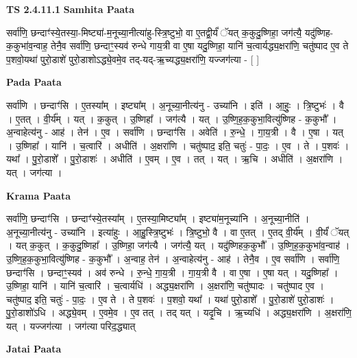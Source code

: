 \documentclass[17pt]{extarticle}
\begin{document}
\textbf{TS 2.4.11.1 } \newline
\textbf{Samhita Paata} \newline

सर्वा॑णि॒ छन्दाꣳ॑स्ये॒तस्या॒-मिष्ट्या॑-म॒नूच्या॒नीत्या॑हु-स्त्रि॒ष्टुभो॒ वा ए॒तद्वी॒र्यं॑ ॅयत् क॒कुदु॒ष्णिहा॒ जग॑त्यै॒ यदु॑ष्णिह-क॒कुभा॑व॒न्वाह॒ तेनै॒व सर्वा॑णि॒ छन्दाꣳ॒॒स्यव॑ रुन्धे गाय॒त्री वा ए॒षा यदु॒ष्णिहा॒ यानि॑ च॒त्वार्यद्ध्य॒क्षरा॑णि॒ चतु॑ष्पाद ए॒व ते प॒शवो॒यथा॑ पुरो॒डाशे॑ पुरो॒डाशोऽद्ध्ये॒वमे॒व तद्-यद्-ऋ॒च्यद्ध्य॒क्षरा॑णि॒ यज्जग॑त्या - [  ] \newline

\textbf{Pada Paata} \newline

सर्वा॑णि । छन्दाꣳ॑सि । ए॒तस्या᳚म् । इष्ट्या᳚म् । अ॒नूच्या॒नीत्य॑नु - उच्या॑नि । इति॑ । आ॒हुः॒ । त्रि॒ष्टुभः॑ । वै । ए॒तत् । वी॒र्य᳚म् । यत् । क॒कुत् । उ॒ष्णिहा᳚ । जग॑त्यै । यत् । उ॒ष्णि॒ह॒क॒कुभा॒वित्यु॑ष्णिह - क॒कुभौ᳚ । अ॒न्वाहेत्य॑नु - आह॑ । तेन॑ । ए॒व । सर्वा॑णि । छन्दाꣳ॑सि । अवेति॑ । रु॒न्धे॒ । गा॒य॒त्री । वै । ए॒षा । यत् । उ॒ष्णिहा᳚ । यानि॑ । च॒त्वारि॑ । अधीति॑ । अ॒क्षरा॑णि । चतु॑ष्पाद॒ इति॒ चतुः॑ - पा॒दः॒ । ए॒व । ते । प॒शवः॑ । यथा᳚ । पु॒रो॒डाशे᳚ । पु॒रो॒डाशः॑ । अधीति॑ । ए॒वम् । ए॒व । तत् । यत् । ऋ॒चि । अधीति॑ । अ॒क्षरा॑णि । यत् । जग॑त्या ।  \newline


\textbf{Krama Paata} \newline

सर्वा॑णि॒ छन्दाꣳ॑सि । छन्दाꣳ॑स्ये॒तस्या᳚म् । ए॒तस्या॒मिष्ट्या᳚म् । इष्ट्या॑म॒नूच्या॑नि । अ॒नूच्या॒नीति॑ । अ॒नूच्या॒नीत्य॑नु - उच्या॑नि । इत्या॑हुः । आ॒हु॒स्त्रि॒ष्टुभः॑ । त्रि॒ष्टुभो॒ वै । वा ए॒तत् । ए॒तद् वी॒र्य᳚म् । वी॒र्यं॑ ॅयत् । यत् क॒कुत् । क॒कुदु॒ष्णिहा᳚ । उ॒ष्णिहा॒ जग॑त्यै । जग॑त्यै॒ यत् । यदु॑ष्णिहक॒कुभौ᳚ । उ॒ष्णि॒ह॒क॒कुभा॑व॒न्वाह॑ । उ॒ष्णि॒ह॒क॒कुभा॒वित्यु॑ष्णिह - क॒कुभौ᳚ । अ॒न्वाह॒ तेन॑ । अ॒न्वाहेत्य॑नु - आह॑ । तेनै॒व । ए॒व सर्वा॑णि । सर्वा॑णि॒ छन्दाꣳ॑सि । छन्दाꣳ॒॒स्यव॑ । अव॑ रुन्धे । रु॒न्धे॒ गा॒य॒त्री । गा॒य॒त्री वै । वा ए॒षा । ए॒षा यत् । यदु॒ष्णिहा᳚ । उ॒ष्णिहा॒ यानि॑ । यानि॑ च॒त्वारि॑ । च॒त्वार्यधि॑ । अद्ध्य॒क्षरा॑णि । अ॒क्षरा॑णि॒ चतु॑ष्पादः । चतु॑ष्पाद ए॒व । चतु॑ष्पाद॒ इति॒ चतुः॑ - पा॒दः॒ । ए॒व ते । ते प॒शवः॑ । प॒शवो॒ यथा᳚ । यथा॑ पुरो॒डाशे᳚ । पु॒रो॒डाशे॑ पुरो॒डाशः॑ । पु॒रो॒डाशो॑ऽधि । अद्ध्ये॒वम् । ए॒वमे॒व । ए॒व तत् । तद् यत् । यदृ॒चि । ऋ॒च्यधि॑ । अद्ध्य॒क्षरा॑णि । अ॒क्षरा॑णि॒ यत् । यज्जग॑त्या । जग॑त्या परिद॒द्ध्यात् \newline

\textbf{Jatai Paata} \newline
\end{document}
